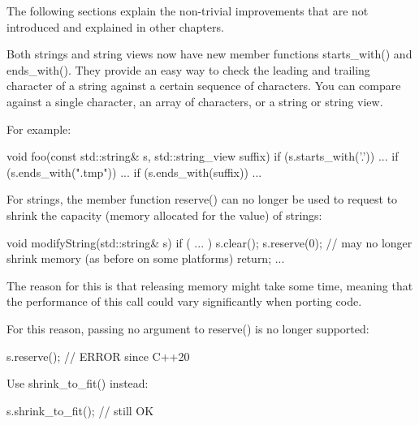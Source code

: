 The following sections explain the non-trivial improvements that are not introduced and explained in other chapters.


Both strings and string views now have new member functions starts\_with() and ends\_with(). They provide an easy way to check the leading and trailing character of a string against a certain sequence of characters. You can compare against a single character, an array of characters, or a string or string view.

For example:

\begin{cpp}
void foo(const std::string& s, std::string_view suffix)
{
	if (s.starts_with('.')) {
		...
	}
	if (s.ends_with(".tmp")) {
		...
	}
	if (s.ends_with(suffix)) {
		...
	}
}
\end{cpp}


For strings, the member function reserve() can no longer be used to request to shrink the capacity (memory allocated for the value) of strings:

\begin{cpp}
void modifyString(std::string& s)
{
	if ( ... ) {
		s.clear();
		s.reserve(0); // may no longer shrink memory (as before on some platforms)
		return;
	}
	...
}
\end{cpp}

The reason for this is that releasing memory might take some time, meaning that the performance of this call could vary significantly when porting code.

For this reason, passing no argument to reserve() is no longer supported:

\begin{cpp}
s.reserve(); // ERROR since C++20
\end{cpp}

Use shrink\_to\_fit() instead:

\begin{cpp}
s.shrink_to_fit(); // still OK
\end{cpp}







